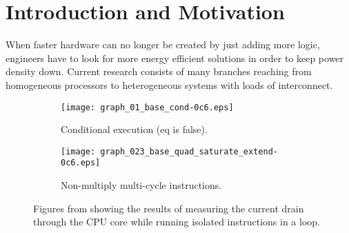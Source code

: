 \section{Introduction and Motivation}

When faster hardware can no longer be created by just adding more
logic, engineers have to look for more energy efficient solutions
in order to keep power density down. Current research consists of
many branches reaching from homogeneous processors to heterogeneous
systems with loads of interconnect.

\begin{figure}
\begin{subfigure}[b]{0.48\textwidth}
\texttt{[image: graph\_01\_base\_cond-0c6.eps]}
\caption{Conditional execution (eq is false).}
\end{subfigure}
\begin{subfigure}[b]{0.52\textwidth}
\texttt{[image: graph\_023\_base\_quad\_saturate\_extend-0c6.eps]}
\caption{Non-multiply multi-cycle instructions.}
\end{subfigure}
\caption{Figures from \cite{rundehvatum2013exploring} showing the results of measuring the
current drain through the CPU core while running isolated instructions in a loop.}
\end{figure}

